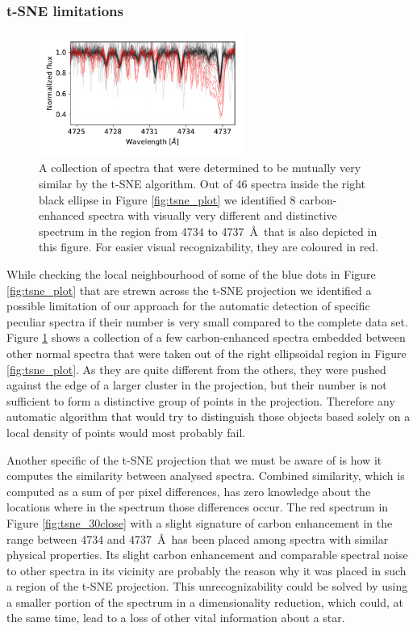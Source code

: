 \subsubsection{t-SNE limitations}
\begin{figure}
	\centering
	\includegraphics[width=0.6\textwidth]{tsne_cemp.pdf}
	\caption{A collection of spectra that were determined to be mutually very similar by the t-SNE algorithm. Out of 46 spectra inside the right black ellipse in Figure \ref{fig:tsne_plot} we identified 8 carbon-enhanced spectra with visually very different and distinctive spectrum in the region from 4734 to 4737~\AA\ that is also depicted in this figure. For easier visual recognizability, they are coloured in red.}
	\label{fig:tsne_cemps}
\end{figure}

While checking the local neighbourhood of some of the blue dots in Figure \ref{fig:tsne_plot} that are strewn across the t-SNE projection we identified a possible limitation of our approach for the automatic detection of specific peculiar spectra if their number is very small compared to the complete data set. Figure \ref{fig:tsne_cemps} shows a collection of a few carbon-enhanced spectra embedded between other normal spectra that were taken out of the right ellipsoidal region in Figure \ref{fig:tsne_plot}. As they are quite different from the others, they were pushed against the edge of a larger cluster in the projection, but their number is not sufficient to form a distinctive group of points in the projection. Therefore any automatic algorithm that would try to distinguish those objects based solely on a local density of points would most probably fail.

Another specific of the t-SNE projection that we must be aware of is how it computes the similarity between analysed spectra. Combined similarity, which is computed as a sum of per pixel differences, has zero knowledge about the locations where in the spectrum those differences occur. The red spectrum in Figure \ref{fig:tsne_30close} with a slight signature of carbon enhancement in the range between 4734 and 4737~\AA\ has been placed among spectra with similar physical properties. Its slight carbon enhancement and comparable spectral noise to other spectra in its vicinity are probably the reason why it was placed in such a region of the t-SNE projection. This unrecognizability could be solved by using a smaller portion of the spectrum in a dimensionality reduction, which could, at the same time, lead to a loss of other vital information about a star.

